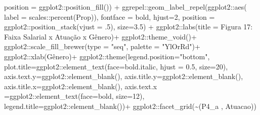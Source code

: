\documentclass[
]{article}
\newenvironment{Shaded}{\begin{snugshade}}{\end{snugshade}}
\newcommand{\AttributeTok}[1]{\textcolor[rgb]{0.77,0.63,0.00}{#1}}
\newcommand{\DecValTok}[1]{\textcolor[rgb]{0.00,0.00,0.81}{#1}}
\newcommand{\FloatTok}[1]{\textcolor[rgb]{0.00,0.00,0.81}{#1}}
\newcommand{\FunctionTok}[1]{\textcolor[rgb]{0.00,0.00,0.00}{#1}}
\newcommand{\NormalTok}[1]{#1}
\newcommand{\SpecialCharTok}[1]{\textcolor[rgb]{0.00,0.00,0.00}{#1}}
\newcommand{\StringTok}[1]{\textcolor[rgb]{0.31,0.60,0.02}{#1}}
\begin{document}
\begin{Shaded}
\begin{Highlighting}[]
                     \AttributeTok{position =}\NormalTok{ ggplot2}\SpecialCharTok{::}\FunctionTok{position\_fill}\NormalTok{()) }\SpecialCharTok{+}
\NormalTok{  ggrepel}\SpecialCharTok{::}\FunctionTok{geom\_label\_repel}\NormalTok{(ggplot2}\SpecialCharTok{::}\FunctionTok{aes}\NormalTok{(}
    \AttributeTok{label =}\NormalTok{ scales}\SpecialCharTok{::}\FunctionTok{percent}\NormalTok{(Prop)),}
    \AttributeTok{fontface =} \StringTok{\textquotesingle{}bold\textquotesingle{}}\NormalTok{,}
    \AttributeTok{hjust=}\DecValTok{2}\NormalTok{,}
    \AttributeTok{position =}\NormalTok{ ggplot2}\SpecialCharTok{::}\FunctionTok{position\_stack}\NormalTok{(}\AttributeTok{vjust =}\NormalTok{ .}\DecValTok{5}\NormalTok{),}
    \AttributeTok{size=}\FloatTok{3.5}\NormalTok{) }\SpecialCharTok{+}
\NormalTok{  ggplot2}\SpecialCharTok{::}\FunctionTok{labs}\NormalTok{(}\AttributeTok{title =} \StringTok{\textquotesingle{}Figura 17: Faixa Salarial x Atuação x Gênero\textquotesingle{}}\NormalTok{)}\SpecialCharTok{+}
\NormalTok{  ggplot2}\SpecialCharTok{::}\FunctionTok{theme\_void}\NormalTok{()}\SpecialCharTok{+}
\NormalTok{  ggplot2}\SpecialCharTok{::}\FunctionTok{scale\_fill\_brewer}\NormalTok{(}\AttributeTok{type =} \StringTok{"seq"}\NormalTok{, }\AttributeTok{palette =} \StringTok{"YlOrRd"}\NormalTok{)}\SpecialCharTok{+}
\NormalTok{  ggplot2}\SpecialCharTok{::}\FunctionTok{xlab}\NormalTok{(}\StringTok{\textquotesingle{}Gênero\textquotesingle{}}\NormalTok{)}\SpecialCharTok{+}
\NormalTok{  ggplot2}\SpecialCharTok{::}\FunctionTok{theme}\NormalTok{(}\AttributeTok{legend.position=}\StringTok{"bottom"}\NormalTok{,}
                 \AttributeTok{plot.title=}\NormalTok{ggplot2}\SpecialCharTok{::}\FunctionTok{element\_text}\NormalTok{(}\AttributeTok{face=}\StringTok{\textquotesingle{}bold.italic\textquotesingle{}}\NormalTok{,}
                                                  \AttributeTok{hjust =} \FloatTok{0.5}\NormalTok{, }\AttributeTok{size=}\DecValTok{20}\NormalTok{),}
                 \AttributeTok{axis.text.y=}\NormalTok{ggplot2}\SpecialCharTok{::}\FunctionTok{element\_blank}\NormalTok{(),}
                 \AttributeTok{axis.title.y=}\NormalTok{ggplot2}\SpecialCharTok{::}\FunctionTok{element\_blank}\NormalTok{(),}
                 \AttributeTok{axis.title.x=}\NormalTok{ggplot2}\SpecialCharTok{::}\FunctionTok{element\_blank}\NormalTok{(),}
                 \AttributeTok{axis.text.x =}\NormalTok{ggplot2}\SpecialCharTok{::}\FunctionTok{element\_text}\NormalTok{(}\AttributeTok{face=}\StringTok{\textquotesingle{}bold\textquotesingle{}}\NormalTok{, }\AttributeTok{size=}\DecValTok{12}\NormalTok{),}
                 \AttributeTok{legend.title=}\NormalTok{ggplot2}\SpecialCharTok{::}\FunctionTok{element\_blank}\NormalTok{())}\SpecialCharTok{+}
\NormalTok{  ggplot2}\SpecialCharTok{::}\FunctionTok{facet\_grid}\NormalTok{(}\SpecialCharTok{\textasciitilde{}}\StringTok{\textasciigrave{}}\AttributeTok{(\textquotesingle{}P4\_a \textquotesingle{}, \textquotesingle{}Atuacao\textquotesingle{})}\StringTok{\textasciigrave{}}\NormalTok{)}
\end{Highlighting}
\end{Shaded}
\end{document}
